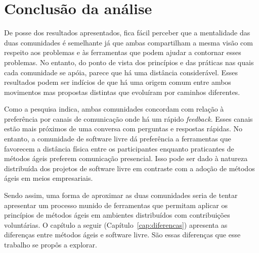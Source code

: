 \section{Conclusão da análise}
\label{sec:proposta}

De posse dos resultados apresentados, fica fácil perceber que a
mentalidade das duas comunidades é semelhante já que ambas
compartilham a mesma visão com respeito aos problemas e às ferramentas
que podem ajudar a contornar esses problemas. No entanto, do ponto de
vista dos princípios e das práticas nas quais cada comunidade se
apóia, parece que há uma distância considerável. Esses resultados
podem ser indícios de que há uma origem comum entre ambos movimentos
mas propostas distintas que evoluíram por caminhos diferentes.

Como a pesquisa indica, ambas comunidades concordam com relação à
preferência por canais de comunicação onde há um rápido
\textit{feedback}. Esses canais estão mais próximos de uma conversa
com perguntas e respostas rápidas. No entanto, a comunidade de
software livre dá preferência a ferramentas que favorecem a distância
física entre os participantes enquanto praticantes de métodos ágeis
preferem comunicação presencial. Isso pode ser dado à natureza
distribuída dos projetos de software livre em contraste com a adoção
de métodos ágeis em meios empresariais.

Sendo assim, uma forma de aproximar as duas comunidades seria de
tentar apresentar um processo munido de ferramentas que permitam
aplicar os princípios de métodos ágeis em ambientes distribuídos com
contribuições voluntárias. O capítulo a seguir
(Capítulo~\ref{cap:diferencas}) apresenta as diferenças entre métodos
ágeis e software livre. São essas diferenças que esse trabalho se
propôs a explorar.

